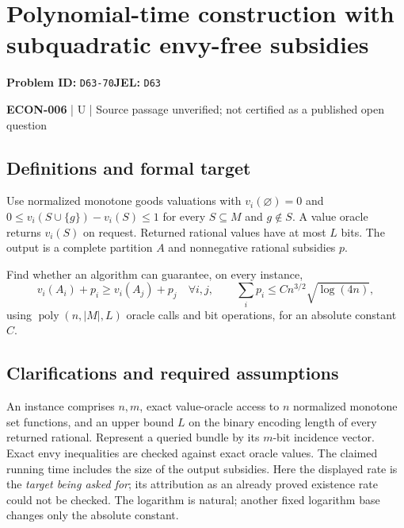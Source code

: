 \documentclass[11pt,a4paper]{article}
\begin{document}
\section*{Polynomial-time construction with subquadratic envy-free subsidies}
\textbf{Problem ID:} \texttt{D63-70}\quad \textbf{JEL:} \texttt{D63}\par
\label{problem:OP-0593}


\label{audited:ECON-006}

{\sffamily\small\color{muted}\textbf{ECON-006} | U | Source passage unverified; not certified as a published open question\par}

\subsection*{Definitions and formal target}

Use normalized monotone goods valuations with $v_i(\varnothing)=0$ and $0\leq v_i(S\cup\{g\})-v_i(S)\leq1$ for every $S\subseteq M$ and $g\notin S$. A value oracle returns $v_i(S)$ on request. Returned rational values have at most $L$ bits. The output is a complete partition $A$ and nonnegative rational subsidies $p$.

Find whether an algorithm can guarantee, on every instance,
\[
 v_i(A_i)+p_i\geq v_i(A_j)+p_j\quad\forall i,j,
 \qquad \sum_i p_i\leq C n^{3/2}\sqrt{\log(4n)},
\]
using $\operatorname{poly}(n,|M|,L)$ oracle calls and bit operations, for an absolute constant $C$.

\subsection*{Clarifications and required assumptions}

An instance comprises $n,m$, exact value-oracle access to $n$ normalized monotone set functions, and an upper bound $L$ on the binary encoding length of every returned rational. Represent a queried bundle by its $m$-bit incidence vector. Exact envy inequalities are checked against exact oracle values. The claimed running time includes the size of the output subsidies. Here the displayed rate is the \emph{target being asked for}; its attribution as an already proved existence rate could not be checked. The logarithm is natural; another fixed logarithm base changes only the absolute constant.
\end{document}
